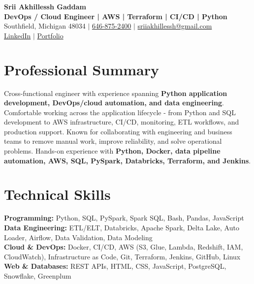 \documentclass[letterpaper,10pt]{article}
\begin{document}
\fontsize{9.35pt}{10.45pt}\selectfont

\begin{center}
    {\LARGE \textbf{Srii Akhillessh Gaddam}} \\[-1pt]
    \textbf{DevOps / Cloud Engineer | AWS | Terraform | CI/CD | Python} \\[2pt]
    Southfield, Michigan 48034 $|$
    \href{tel:6468752400}{646-875-2400} $|$
    \href{mailto:sriiakhillessh@gmail.com}{sriiakhillessh@gmail.com} \\[1pt]
    \href{https://www.linkedin.com/in/srii-akhiilessh-gaddam-b48668191/}{LinkedIn} $|$
    \href{https://sriiakhillesshg.github.io/portfolio/}{Portfolio}
\end{center}
\vspace{-8pt}

\section{Professional Summary}
\small{Cross-functional engineer with experience spanning \textbf{Python application development, DevOps/cloud automation, and data engineering}. Comfortable working across the application lifecycle - from Python and SQL development to AWS infrastructure, CI/CD, monitoring, ETL workflows, and production support. Known for collaborating with engineering and business teams to remove manual work, improve reliability, and solve operational problems. Hands-on experience with \textbf{Python, Docker, data pipeline automation, AWS, SQL, PySpark, Databricks, Terraform, and Jenkins}.}

\section{Technical Skills}
\small{
\textbf{Programming:} Python, SQL, PySpark, Spark SQL, Bash, Pandas, JavaScript \\
\textbf{Data Engineering:} ETL/ELT, Databricks, Apache Spark, Delta Lake, Auto Loader, Airflow, Data Validation, Data Modeling \\
\textbf{Cloud \& DevOps:} Docker, CI/CD, AWS (S3, Glue, Lambda, Redshift, IAM, CloudWatch), Infrastructure as Code, Git, Terraform, Jenkins, GitHub, Linux \\
\textbf{Web \& Databases:} REST APIs, HTML, CSS, JavaScript, PostgreSQL, Snowflake, Greenplum
}
\end{document}
